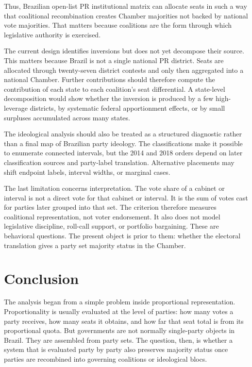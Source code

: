 \documentclass[11pt]{article}
\begin{document}
Thus, Brazilian open-list PR institutional matrix can allocate seats in such a
way that coalitional recombination creates Chamber majorities not backed by
national vote majorities. That matters because coalitions are the form
through which legislative authority is exercised.

The current design identifies inversions but does not yet decompose their source.
This matters because Brazil is not a single national PR district. Seats are
allocated through twenty-seven district contests and only then aggregated into a
national Chamber. Further contributions should therefore compute the contribution of
each state to each coalition's seat differential. A state-level decomposition would
show whether the inversion is produced by a few high-leverage districts, by
systematic federal apportionment effects, or by small surpluses accumulated across
many states.

The ideological analysis should also be treated as a structured diagnostic rather
than a final map of Brazilian party ideology. The classifications make it possible
to enumerate connected intervals, but the 2014 and 2018 orders depend on later
classification sources and party-label translation. Alternative placements may
shift endpoint labels, interval widths, or marginal cases.

The last limitation concerns interpretation. The vote share of a cabinet or
interval is not a direct vote for that cabinet or interval. It is the sum of votes
cast for parties later grouped into that set. The criterion therefore measures
coalitional representation, not voter endorsement. It also does not model
legislative discipline, roll-call support, or portfolio bargaining. These are
behavioral questions. The present object is prior to them: whether the electoral
translation gives a party set majority status in the Chamber.


\section{Conclusion}

The analysis began from a simple problem inside proportional representation.
Proportionality is usually evaluated at the level of parties: how many votes a
party receives, how many seats it obtains, and how far that seat total is from
its proportional quota. But governments are not normally single-party objects in
Brazil. They are assembled from party sets. The question, then, is whether a
system that is evaluated party by party also preserves majority status once
parties are recombined into governing coalitions or ideological blocs.
\end{document}
